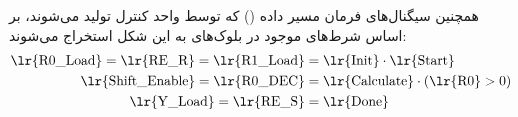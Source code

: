 \begin{enumerate}
          همچنین سیگنال‌های فرمان مسیر داده () که توسط واحد کنترل تولید می‌شوند، بر اساس شرط‌های موجود در بلوک‌های  به این شکل استخراج می‌شوند:
          \begin{align*}
              \text{\lr{R0\_Load}} = \text{\lr{RE\_R}} = \text{\lr{R1\_Load}} & = \text{\lr{Init}} \cdot \text{\lr{Start}}         \\
              \text{\lr{Shift\_Enable}} = \text{\lr{R0\_DEC}}                 & = \text{\lr{Calculate}} \cdot (\text{\lr{R0}} > 0) \\
              \text{\lr{Y\_Load}} = \text{\lr{RE\_S}}                         & = \text{\lr{Done}}
          \end{align*}
\end{enumerate}